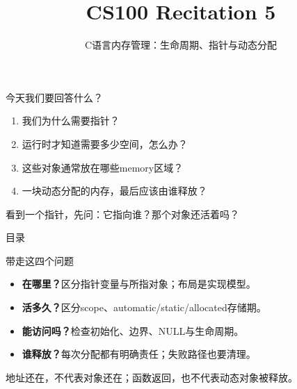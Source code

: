 \documentclass[red,tutorial,sectionpages,shtu]{vsp-beamer}
\title{CS100 Recitation 5}
\subtitle{C语言内存管理：生命周期、指针与动态分配}
\begin{document}
\VSPtitleframe
\begin{frame}{今天我们要回答什么？}
    \begin{enumerate}
        \item 我们为什么需要指针？
        \item 运行时才知道需要多少空间，怎么办？
        \item 这些对象通常放在哪些memory区域？
        \item 一块动态分配的内存，最后应该由谁释放？
    \end{enumerate}
    \medskip
    \alert{看到一个指针，先问：它指向谁？那个对象还活着吗？}
\end{frame}
\begin{frame}{目录}
    \tableofcontents[hideallsubsections]
\end{frame}




\begin{frame}{带走这四个问题}
\begin{itemize}
\item \textbf{在哪里？}区分指针变量与所指对象；布局是实现模型。
\item \textbf{活多久？}区分scope、automatic/static/allocated存储期。
\item \textbf{能访问吗？}检查初始化、边界、NULL与生命周期。
\item \textbf{谁释放？}每次分配都有明确责任；失败路径也要清理。
\end{itemize}
\medskip\alert{地址还在，不代表对象还在；函数返回，也不代表动态对象被释放。}
\end{frame}
\VSPendframe{}
\appendix

\end{document}
